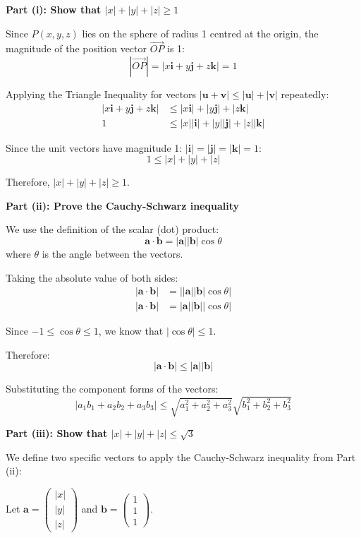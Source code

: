 \begin{solution}
\textbf{Part (i): Show that $|x| + |y| + |z| \ge 1$}

Since $P(x, y, z)$ lies on the sphere of radius 1 centred at the origin, the magnitude of the position vector $\vec{OP}$ is 1:
\[
|\vec{OP}| = |x\mathbf{i} + y\mathbf{j} + z\mathbf{k}| = 1
\]

Applying the Triangle Inequality for vectors $|\mathbf{u} + \mathbf{v}| \le |\mathbf{u}| + |\mathbf{v}|$ repeatedly:
\begin{align*}
    |x\mathbf{i} + y\mathbf{j} + z\mathbf{k}| &\le |x\mathbf{i}| + |y\mathbf{j}| + |z\mathbf{k}| \\
    1 &\le |x||\mathbf{i}| + |y||\mathbf{j}| + |z||\mathbf{k}|
\end{align*}

Since the unit vectors have magnitude 1: $|\mathbf{i}| = |\mathbf{j}| = |\mathbf{k}| = 1$:
\[
1 \le |x| + |y| + |z|
\]

Therefore, $|x| + |y| + |z| \ge 1$.

\medskip
\textbf{Part (ii): Prove the Cauchy-Schwarz inequality}

We use the definition of the scalar (dot) product:
\[
\mathbf{a} \cdot \mathbf{b} = |\mathbf{a}| |\mathbf{b}| \cos \theta
\]
where $\theta$ is the angle between the vectors.

Taking the absolute value of both sides:
\begin{align*}
    |\mathbf{a} \cdot \mathbf{b}| &= ||\mathbf{a}| |\mathbf{b}| \cos \theta| \\
    |\mathbf{a} \cdot \mathbf{b}| &= |\mathbf{a}| |\mathbf{b}| |\cos \theta|
\end{align*}

Since $-1 \le \cos \theta \le 1$, we know that $|\cos \theta| \le 1$.

Therefore:
\[
|\mathbf{a} \cdot \mathbf{b}| \le |\mathbf{a}| |\mathbf{b}|
\]

Substituting the component forms of the vectors:
\[
|a_1b_1 + a_2b_2 + a_3b_3| \le \sqrt{a_1^2 + a_2^2 + a_3^2} \sqrt{b_1^2 + b_2^2 + b_3^2}
\]

\medskip
\textbf{Part (iii): Show that $|x| + |y| + |z| \le \sqrt{3}$}

We define two specific vectors to apply the Cauchy-Schwarz inequality from Part (ii):

Let $\mathbf{a} = \begin{pmatrix} |x| \\ |y| \\ |z| \end{pmatrix}$ and $\mathbf{b} = \begin{pmatrix} 1 \\ 1 \\ 1 \end{pmatrix}$.


\end{solution}

